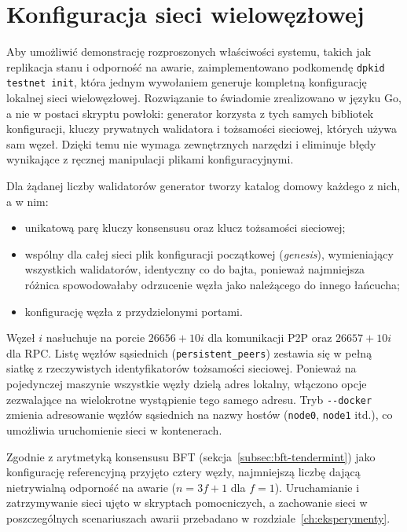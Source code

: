 \section{Konfiguracja sieci wielowęzłowej}
\label{sec:siec-wielowezlowa}

Aby umożliwić demonstrację rozproszonych właściwości systemu, takich jak replikacja stanu i odporność na awarie, zaimplementowano podkomendę \texttt{dpkid testnet init}, która jednym wywołaniem generuje kompletną konfigurację lokalnej sieci wielowęzłowej. Rozwiązanie to świadomie zrealizowano w języku Go, a nie w postaci skryptu powłoki: generator korzysta z tych samych bibliotek konfiguracji, kluczy prywatnych walidatora i tożsamości sieciowej, których używa sam węzeł. Dzięki temu nie wymaga zewnętrznych narzędzi i eliminuje błędy wynikające z ręcznej manipulacji plikami konfiguracyjnymi.

Dla żądanej liczby walidatorów generator tworzy katalog domowy każdego z nich, a w nim:
\begin{itemize}
    \item unikatową parę kluczy konsensusu oraz klucz tożsamości sieciowej;
    \item wspólny dla całej sieci plik konfiguracji początkowej (\emph{genesis}), wymieniający wszystkich walidatorów, identyczny co do bajta, ponieważ najmniejsza różnica spowodowałaby odrzucenie węzła jako należącego do innego łańcucha;
    \item konfigurację węzła z przydzielonymi portami.
\end{itemize}

Węzeł $i$ nasłuchuje na porcie $26656 + 10i$ dla komunikacji P2P oraz $26657 + 10i$ dla RPC. Listę węzłów sąsiednich (\texttt{persistent\_peers}) zestawia się w pełną siatkę z rzeczywistych identyfikatorów tożsamości sieciowej. Ponieważ na pojedynczej maszynie wszystkie węzły dzielą adres lokalny, włączono opcje zezwalające na wielokrotne wystąpienie tego samego adresu. Tryb \texttt{-{}-docker} zmienia adresowanie węzłów sąsiednich na nazwy hostów (\texttt{node0}, \texttt{node1} itd.), co umożliwia uruchomienie sieci w kontenerach.

Zgodnie z arytmetyką konsensusu BFT (sekcja~\ref{subsec:bft-tendermint}) jako konfigurację referencyjną przyjęto cztery węzły, najmniejszą liczbę dającą nietrywialną odporność na awarie ($n = 3f + 1$ dla $f = 1$). Uruchamianie i zatrzymywanie sieci ujęto w skryptach pomocniczych, a zachowanie sieci w poszczególnych scenariuszach awarii przebadano w rozdziale~\ref{ch:eksperymenty}.

